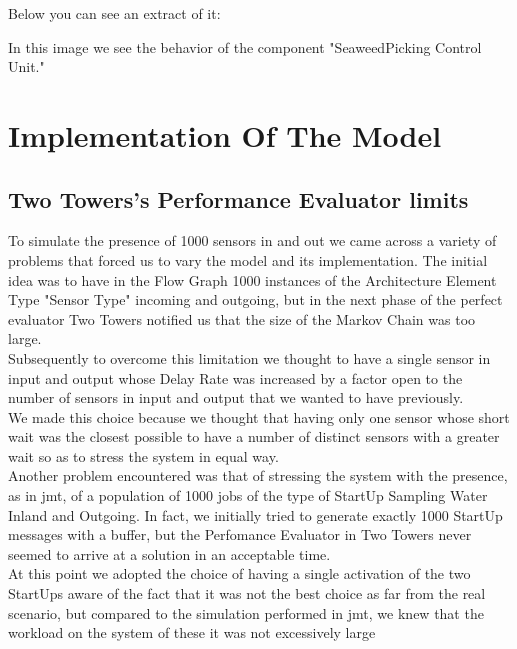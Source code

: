 Below you can see an extract of it:

\begin{center}
\end{center}
\bigskip
{}
\bigskip

In this image we see the behavior of the component "SeaweedPicking Control Unit." 


\section{Implementation Of The Model}

\subsection{Two Towers's Performance Evaluator limits}

To simulate the presence of 1000 sensors in and out we came across a variety of problems that forced us to vary the model and its implementation. The initial idea was to have in the Flow Graph 1000 instances of the Architecture Element Type "Sensor Type" incoming and outgoing, but in the next phase of the perfect evaluator Two Towers notified us that the size of the Markov Chain was too large.\\
Subsequently to overcome this limitation we thought to have a single sensor in input and output whose Delay Rate was increased by a factor open to the number of sensors in input and output that we wanted to have previously.\\
We made this choice because we thought that having only one sensor whose short wait was the closest possible to have a number of distinct sensors with a greater wait so as to stress the system in equal way.\\
Another problem encountered was that of stressing the system with the presence, as in jmt, of a population of 1000 jobs of the type of StartUp Sampling Water Inland and Outgoing. In fact, we initially tried to generate exactly 1000 StartUp messages with a buffer, but the Perfomance Evaluator in Two Towers never seemed to arrive at a solution in an acceptable time.\\
At this point we adopted the choice of having a single activation of the two StartUps aware of the fact that it was not the best choice as far from the real scenario, but compared to the simulation performed in jmt, we knew that the workload on the system of these it was not excessively large\\

